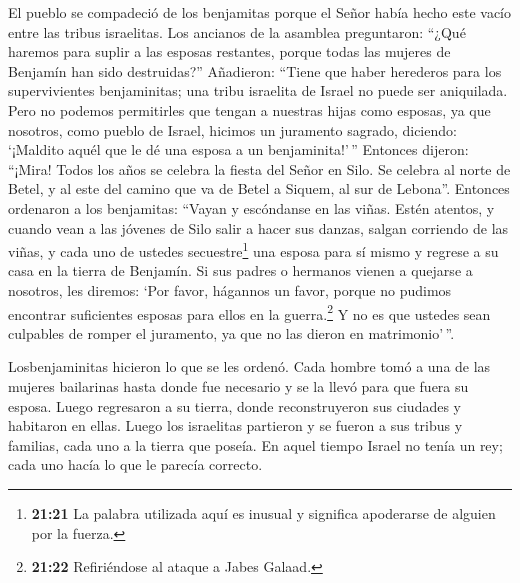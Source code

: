  El pueblo se compadeció de los benjamitas porque el
Señor había hecho este vacío entre las tribus israelitas.
 Los ancianos de la asamblea preguntaron: ``¿Qué haremos
para suplir a las esposas restantes, porque todas las mujeres de
Benjamín han sido destruidas?''  Añadieron: ``Tiene que
haber herederos para los supervivientes benjaminitas; una tribu
israelita de Israel no puede ser aniquilada.  Pero no
podemos permitirles que tengan a nuestras hijas como esposas, ya que
nosotros, como pueblo de Israel, hicimos un juramento sagrado, diciendo:
`¡Maldito aquél que le dé una esposa a un benjaminita!'\,''
 Entonces dijeron: ``¡Mira! Todos los años se celebra la
fiesta del Señor en Silo. Se celebra al norte de Betel, y al este del
camino que va de Betel a Siquem, al sur de Lebona''. 
Entonces ordenaron a los benjamitas: ``Vayan y escóndanse en las viñas.
 Estén atentos, y cuando vean a las jóvenes de Silo salir
a hacer sus danzas, salgan corriendo de las viñas, y cada uno de ustedes
secuestre\footnote{\textbf{21:21} La palabra utilizada aquí es inusual y
  significa apoderarse de alguien por la fuerza.} una esposa para sí
mismo y regrese a su casa en la tierra de Benjamín.  Si
sus padres o hermanos vienen a quejarse a nosotros, les diremos: `Por
favor, hágannos un favor, porque no pudimos encontrar suficientes
esposas para ellos en la guerra.\footnote{\textbf{21:22} Refiriéndose al
  ataque a Jabes Galaad.} Y no es que ustedes sean culpables de romper
el juramento, ya que no las dieron en matrimonio'\,''.

 Losbenjaminitas hicieron lo que se les ordenó. Cada
hombre tomó a una de las mujeres bailarinas hasta donde fue necesario y
se la llevó para que fuera su esposa. Luego regresaron a su tierra,
donde reconstruyeron sus ciudades y habitaron en ellas. 
Luego los israelitas partieron y se fueron a sus tribus y familias, cada
uno a la tierra que poseía.  En aquel tiempo Israel no
tenía un rey; cada uno hacía lo que le parecía correcto.
